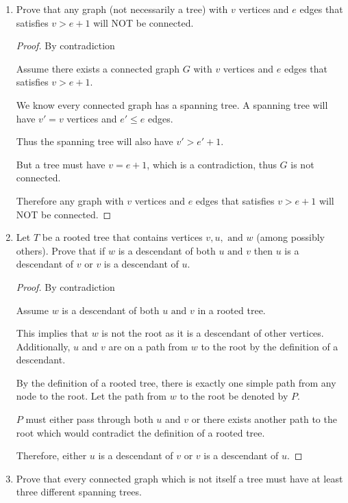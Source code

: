 \documentclass[11pt, letterpaper, includehead]{article}
\theoremstyle{plain}
\theoremstyle{mydefinition}
\theoremstyle{myproperty}
\begin{document}
\begin{enumerate}[label=\textbf{\arabic*}., leftmargin=*]
    \item Prove that any graph (not necessarily a tree) with $v$ vertices and $e$ edges that satisfies $v > e + 1$ will NOT be connected.

    \begin{proof} By contradiction

        Assume there exists a connected graph $G$ with $v$ vertices and $e$ edges that satisfies $v > e + 1$.
    
        We know every connected graph has a spanning tree. A spanning tree will have $v' = v$ vertices and $e' \leq e$ edges. 
        
        Thus the spanning tree will also have $v' > e' + 1$.

        But a tree must have $v = e + 1$, which is a contradiction, thus $G$ is not connected. 

        Therefore any graph with $v$ vertices and $e$ edges that satisfies $v > e + 1$ will NOT be connected.
    \end{proof}

    \item Let $T$ be a rooted tree that contains vertices $v, u, \text{ and } w$ (among possibly others). Prove that if $w$ is a descendant of both $u \text{ and } v$ then $u$ is a descendant of $v$ or $v$ is a descendant of $u$.
    
    \begin{proof} By contradiction

        Assume $w$ is a descendant of both $u \text{ and } v$ in a rooted tree.

        This implies that $w$ is not the root as it is a descendant of other vertices. Additionally, $u$ and $v$ are on a path from $w$ to the root by the definition of a descendant.

        By the definition of a rooted tree, there is exactly one simple path from any node to the root. Let the path from $w$ to the root be denoted by $P$.
    
        $P$ must either pass through both $u$ and $v$ or there exists another path to the root which would contradict the definition of a rooted tree.

        Therefore, either $u$ is a descendant of $v$ or $v$ is a descendant of $u$.    
    \end{proof}
    
    \item Prove that every connected graph which is not itself a tree must have at least three different spanning trees.


\end{enumerate}
\end{document}
